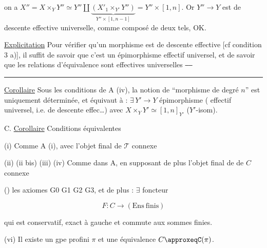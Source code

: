 on a $X''=X\times_Y Y''\simeq Y''\amalg\underbrace{(X'_1\times_{Y'}Y'')}_{Y''\times[1,n-1]}=Y''\times[1,n]$. Or $Y''\longrightarrow Y$ est de descente effective universelle, comme composé de deux tels, OK.

\uline{Explicitation} Pour vérifier qu'un  morphisme est de descente effective [cf condition 3 a)], il suffit de savoir que c'est un épimorphisme effectif universel, et de savoir que les relations d'équivalence sont effectives universelles \texttt{------}


\noindent\rule{.25\linewidth}{.3pt}

\uline{Corollaire} Sous les conditions de A (iv), la notion de ``morphisme de degré $n$'' est uniquement déterminée, et  équivaut à : $\exists\,Y'\longrightarrow Y$ épimorphisme (  effectif universel, i.e. de descente effec\ldots{}) avec $X\times_Y Y'\simeq[1,n]_{Y'}$ ($Y'$-isom).


C. \uline{Corollaire} Conditions équivalentes

(i) Comme A (i), avec l'objet final de $\mathscr T$ connexe

(ii) (ii bis) (iii) (iv) Comme dans A, en supposant de plus l'objet final de de $C$ connexe

()   les axiomes G0 G1 G2 G3, et de plus : $\exists$ foncteur 

\[
F:C\longrightarrow(\mathrm{Ens\ finis})
\]

qui est conservatif, exact à gauche et commute aux sommes finies.

(vi) Il existe un gpe profini $\pi$ et une équivalence $C\approxeqC(\pi)$.


